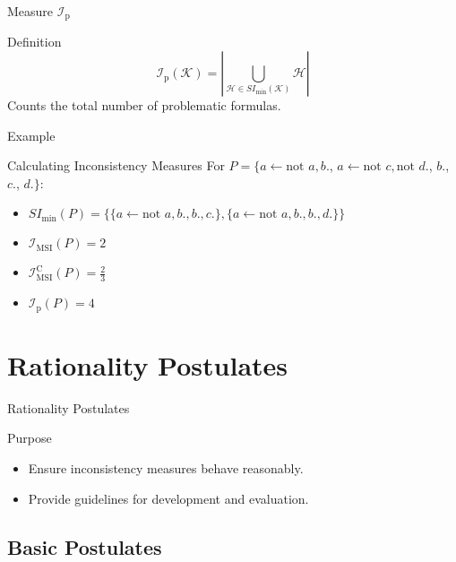 \begin{frame}{Measure $\mathcal{I}_{\text{p}}$}
    \begin{block}{Definition}
        \[
            \mathcal{I}_{\text{p}}(\mathcal{K}) = \left| \bigcup_{\mathcal{H} \in SI_{\min}(\mathcal{K})} \mathcal{H} \right|
        \]
        Counts the total number of problematic formulas.
    \end{block}
\end{frame}

\begin{frame}{Example}
    \begin{exampleblock}{Calculating Inconsistency Measures}
        For $P = \{a \leftarrow \text{not } a, b.$, $a \leftarrow \text{not } c, \text{not } d.$, $b.$, $c.$, $d.\}$:

        \begin{itemize}
            \item $SI_{\min}(P) = \{\{a \leftarrow \text{not } a, b., b., c.\}, \{a \leftarrow \text{not } a, b., b., d.\}\}$
            \item $\mathcal{I}_{\text{MSI}}(P) = 2$
            \item $\mathcal{I}_{\text{MSI}}^\text{C}(P) = \frac{2}{3}$
            \item $\mathcal{I}_{\text{p}}(P) = 4$
        \end{itemize}
    \end{exampleblock}
\end{frame}

\section{Rationality Postulates}

\begin{frame}{Rationality Postulates}
    \begin{block}{Purpose}
        \begin{itemize}
            \item Ensure inconsistency measures behave reasonably.
            \item Provide guidelines for development and evaluation.
        \end{itemize}
    \end{block}
\end{frame}

\subsection{Basic Postulates}

